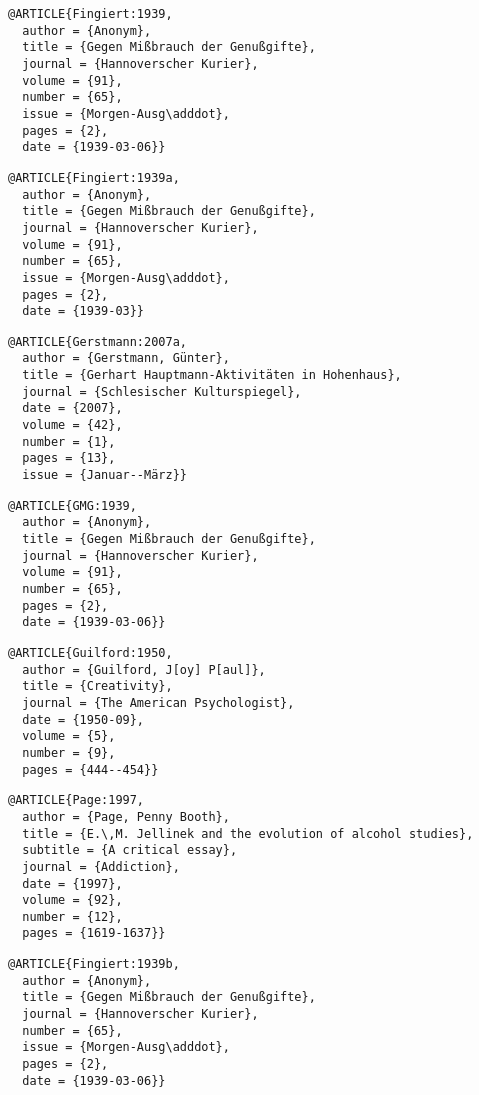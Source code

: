 \documentclass[ngerman]{scrartcl}
\begin{document}
\begin{lstlisting}
@ARTICLE{Fingiert:1939,
  author = {Anonym},
  title = {Gegen Mißbrauch der Genußgifte},
  journal = {Hannoverscher Kurier},
  volume = {91},
  number = {65},
  issue = {Morgen-Ausg\adddot},
  pages = {2},
  date = {1939-03-06}}
\end{lstlisting}

\begin{lstlisting}
@ARTICLE{Fingiert:1939a,
  author = {Anonym},
  title = {Gegen Mißbrauch der Genußgifte},
  journal = {Hannoverscher Kurier},
  volume = {91},
  number = {65},
  issue = {Morgen-Ausg\adddot},
  pages = {2},
  date = {1939-03}}
\end{lstlisting}

\begin{lstlisting}
@ARTICLE{Gerstmann:2007a,
  author = {Gerstmann, Günter},
  title = {Gerhart Hauptmann-Aktivitäten in Hohenhaus},
  journal = {Schlesischer Kulturspiegel},
  date = {2007},
  volume = {42},
  number = {1},
  pages = {13},
  issue = {Januar--März}}
\end{lstlisting}

\begin{lstlisting}
@ARTICLE{GMG:1939,
  author = {Anonym},
  title = {Gegen Mißbrauch der Genußgifte},
  journal = {Hannoverscher Kurier},
  volume = {91},
  number = {65},
  pages = {2},
  date = {1939-03-06}}
\end{lstlisting}

\begin{lstlisting}
@ARTICLE{Guilford:1950,
  author = {Guilford, J[oy] P[aul]},
  title = {Creativity},
  journal = {The American Psychologist},
  date = {1950-09},
  volume = {5},
  number = {9},
  pages = {444--454}}
\end{lstlisting}

\begin{lstlisting}
@ARTICLE{Page:1997,
  author = {Page, Penny Booth},
  title = {E.\,M. Jellinek and the evolution of alcohol studies},
  subtitle = {A critical essay},
  journal = {Addiction},
  date = {1997},
  volume = {92},
  number = {12},
  pages = {1619-1637}}
\end{lstlisting}

\begin{lstlisting}
@ARTICLE{Fingiert:1939b,
  author = {Anonym},
  title = {Gegen Mißbrauch der Genußgifte},
  journal = {Hannoverscher Kurier},
  number = {65},
  issue = {Morgen-Ausg\adddot},
  pages = {2},
  date = {1939-03-06}}
\end{lstlisting}
\end{document}
